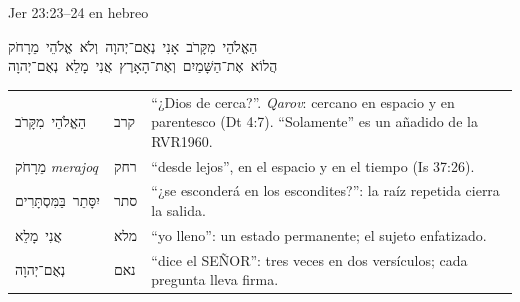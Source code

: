 \documentclass[hyperref={bookmarks=false},aspectratio=169]{beamer}
\newcommand{\heb}[1]{\mbox{\foreignlanguage{hebrew}{#1}}}
\newcommand{\SENOR}{S{\fontsize{0.78em}{1em}\selectfont EÑOR}}
\begin{document}
\begin{frame}{Jer 23:23--24 en hebreo}
\begin{center}\scriptsize\heb{הַאֱלֹהֵי מִקָּרֹב אָנִי נְאֻם־יְהוָה וְלֹא אֱלֹהֵי מֵרָחֹק}\\[1pt]\heb{הֲלוֹא אֶת־הַשָּׁמַיִם וְאֶת־הָאָרֶץ אֲנִי מָלֵא נְאֻם־יְהוָה}\end{center}
\scriptsize\renewcommand{\arraystretch}{1.1}
\begin{tabular}{@{}>{\RaggedRight\arraybackslash}p{2.8cm}>{\RaggedRight\arraybackslash}p{0.9cm}>{\RaggedRight\arraybackslash}p{8.1cm}@{}}
\toprule
\heb{הַאֱלֹהֵי מִקָּרֹב} & \heb{קרב} & ``¿Dios de cerca?''. \emph{Qarov}: cercano en espacio y en parentesco (Dt 4:7). ``Solamente'' es un añadido de la RVR1960. \\
\heb{מֵרָחֹק} \emph{merajoq} & \heb{רחק} & ``desde lejos'', en el espacio y en el tiempo (Is 37:26). \\
\heb{יִסָּתֵר בַּמִּסְתָּרִים} & \heb{סתר} & ``¿se esconderá en los escondites?'': la raíz repetida cierra la salida. \\
\heb{אֲנִי מָלֵא} & \heb{מלא} & ``yo lleno'': un estado permanente; el sujeto enfatizado. \\
\heb{נְאֻם־יְהוָה} & \heb{נאם} & ``dice el \SENOR'': tres veces en dos versículos; cada pregunta lleva firma. \\
\bottomrule
\end{tabular}
\end{frame}
\end{document}
